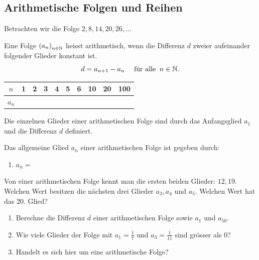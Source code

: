 \documentclass[11pt,oneside]{article}
\begin{document}
\subsection{Arithmetische Folgen und Reihen}
	Betrachten wir die Folge $2,8,14,20,26,\ldots$
	\begin{definition}
		Eine Folge $\left(a_n\right)_{n\in\mathbb{N}}$ heisst arithmetisch, wenn die Differenz $d$ zweier aufeinander folgender Glieder konstant ist. \[d=a_{n+1}-a_n \quad\text{ für alle }\:n\in\mathbb{N}.\]
	\end{definition}
	\begingroup
	\renewcommand{\arraystretch}{1.5}
	\begin{table}[H]
		\vspace{24pt}
		\centering
		\begin{tabular}{c|p{8mm}|p{8mm}|p{8mm}|p{8mm}|p{8mm}|p{10mm}|p{10mm}|p{10mm}|p{10mm}}
			$n$ & 1 & 2 & 3 & 4 & 5 & 6 & 10 & 20 & 100\\\hline
			$a_n$ & & & & & & & & &
		\end{tabular}
		\vspace{24pt}
	\end{table}
	\endgroup
	Die einzelnen Glieder einer arithmetischen Folge sind durch das Anfangsglied $a_1$ und die Differenz $d$ definiert.
	\begin{satz}
		Das allgemeine Glied $a_n$ einer arithmetischen Folge ist gegeben durch:
		\begin{enumerate}[label=\ ]
			\item $\displaystyle a_n=$
		\end{enumerate}
	\end{satz}
	\begin{beispiel}
		Von einer arithmetischen Folge kennt man die ersten beiden Glieder: $12, 19$. Welchen Wert besitzen die nächsten drei Glieder $a_3, a_4$ und $a_5$. Welchen Wert hat das $20.$ Glied?\\[5pt]
	\end{beispiel}
	\begin{aufgabe}
		\begin{enumerate}
			\item Berechne die Differenz $d$ einer arithmetischen Folge sowie $a_1$ und $a_{50}$.
			\item Wie viele Glieder der Folge mit $a_1=\frac{1}{7}$ und $a_3=\frac{1}{11}$ sind grösser als $0$?
			\item Handelt es sich hier um eine arithmetische Folge?
		\end{enumerate}
	\end{aufgabe}
\end{document}
